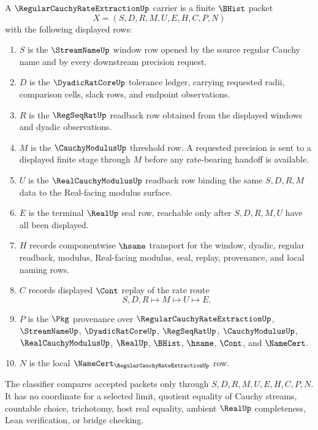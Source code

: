 \begin{definition}
\label{def:regular-cauchy-rate-extraction-carrier}
A $\RegularCauchyRateExtractionUp$ carrier is a finite $\BHist$ packet
$$
X=(S,D,R,M,U,E,H,C,P,N)
$$
with the following displayed rows:
\begin{enumerate}
\item $S$ is the $\StreamNameUp$ window row opened by the source regular Cauchy name and by every downstream precision request.
\item $D$ is the $\DyadicRatCoreUp$ tolerance ledger, carrying requested radii, comparison cells, slack rows, and endpoint observations.
\item $R$ is the $\RegSeqRatUp$ readback row obtained from the displayed windows and dyadic observations.
\item $M$ is the $\CauchyModulusUp$ threshold row. A requested precision is sent to a displayed finite stage through $M$ before any rate-bearing handoff is available.
\item $U$ is the $\RealCauchyModulusUp$ readback row binding the same $S,D,R,M$ data to the Real-facing modulus surface.
\item $E$ is the terminal $\RealUp$ seal row, reachable only after $S,D,R,M,U$ have all been displayed.
\item $H$ records componentwise $\hsame$ transport for the window, dyadic, regular readback, modulus, Real-facing modulus, seal, replay, provenance, and local naming rows.
\item $C$ records displayed $\Cont$ replay of the rate route
$$
S,D,R \longmapsto M \longmapsto U \longmapsto E .
$$
\item $P$ is the $\Pkg$ provenance over $\RegularCauchyRateExtractionUp$, $\StreamNameUp$, $\DyadicRatCoreUp$, $\RegSeqRatUp$, $\CauchyModulusUp$, $\RealCauchyModulusUp$, $\RealUp$, $\BHist$, $\hsame$, $\Cont$, and $\NameCert$.
\item $N$ is the local $\NameCert_{\RegularCauchyRateExtractionUp}$ row.
\end{enumerate}
The classifier compares accepted packets only through $S,D,R,M,U,E,H,C,P,N$. It has no coordinate for a selected limit, quotient equality of Cauchy streams, countable choice, trichotomy, host real equality, ambient $\RealUp$ completeness, Lean verification, or bridge checking.
\end{definition}

